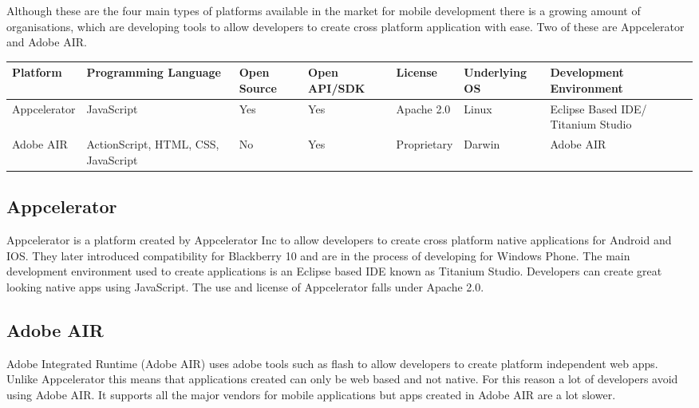 Although these are the four main types of platforms available in the market for mobile development there is a growing amount of organisations, which are developing tools to allow developers to create cross platform application with ease. Two of these are Appcelerator and Adobe AIR.

\begin{table}
    \begin{tabular}{|l|l|l|l|l|l|l|}
    \hline
    Platform     & Programming   Language              & Open Source & Open API/SDK & License     & Underlying OS & Development   Environment          \\ \hline
    Appcelerator & JavaScript                          & Yes         & Yes          & Apache 2.0  & Linux         & Eclipse Based IDE/ Titanium Studio \\ \hline
    Adobe AIR    & ActionScript, HTML, CSS, JavaScript & No          & Yes          & Proprietary & Darwin        & Adobe AIR                          \\ \hline
    \end{tabular}
\end{table}

\subsection{Appcelerator}

Appcelerator is a platform created by Appcelerator Inc to allow developers to create cross platform native applications for Android and IOS. They later introduced compatibility for Blackberry 10 and are in the process of developing for Windows Phone. The main development environment used to create applications is an Eclipse based IDE known as Titanium Studio. Developers can create great looking native apps using JavaScript. The use and license of Appcelerator falls under Apache 2.0.

\subsection{Adobe AIR}

Adobe Integrated Runtime (Adobe AIR) uses adobe tools such as flash to allow developers to create platform independent web apps. Unlike Appcelerator this means that applications created can only be web based and not native. For this reason a lot of developers avoid using Adobe AIR. It supports all the major vendors for mobile applications but apps created in Adobe AIR are a lot slower.

